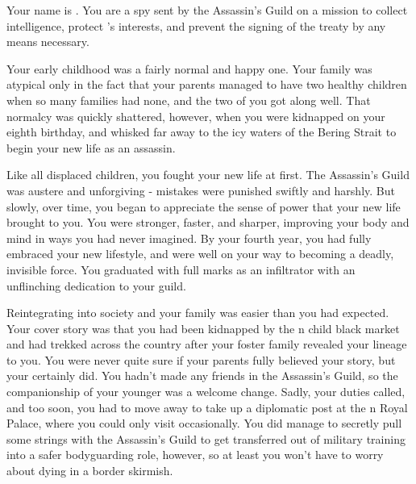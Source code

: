 \documentclass[char]{NeptuneBall}
\begin{document}
\name{\cSpy{}}

Your name is \cSpy{}. You are a spy sent by the Assassin's Guild on a mission to collect intelligence, protect \pPacifica{}'s interests, and prevent the signing of the treaty by any means necessary.

Your early childhood was a fairly normal and happy one. Your family was atypical only in the fact that your parents managed to have two healthy children when so many families had none, and the two of you got along well. That normalcy was quickly shattered, however, when you were kidnapped on your eighth birthday, and whisked far away to the icy waters of the Bering Strait to begin your new life as an assassin.

Like all displaced children, you fought your new life at first. The Assassin's Guild was austere and unforgiving - mistakes were punished swiftly and harshly. But slowly, over time, you began to appreciate the sense of power that your new life brought to you. You were stronger, faster, and sharper, improving your body and mind in ways you had never imagined. By your fourth year, you had fully embraced your new lifestyle, and were well on your way to becoming a deadly, invisible force. You graduated with full marks as an infiltrator with an unflinching dedication to your guild.

Reintegrating into society and your family was easier than you had expected. Your cover story was that you had been kidnapped by the \pPacifica{}n child black market and had trekked across the country after your foster family revealed your lineage to you. You were never quite sure if your parents fully believed your story, but your \cBodyguard{\sibling} \cBodyguard{} certainly did. You hadn't made any friends in the Assassin's Guild, so the companionship of your younger \cBodyguard{\sibling} was a welcome change. Sadly, your duties called, and too soon, you had to move away to take up a diplomatic post at the \pPacifica{}n Royal Palace, where you could only visit \cBodyguard{\them} occasionally. You did manage to secretly pull some strings with the Assassin's Guild to get \cBodyguard{\them} transferred out of military training into a safer bodyguarding role, however, so at least you won't have to worry about \cBodyguard{\them} dying in a border skirmish.
\end{document}
